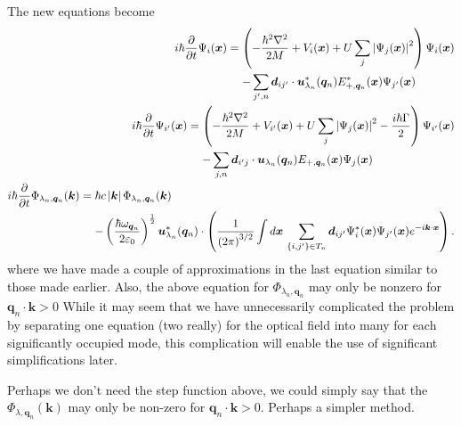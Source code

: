 The new equations become
\begin{subequations}
    \label{OpticalPumping:MeanFieldRWAEvolutionSeparatedOpticalFields}
    \begin{align}
        \begin{split}
            i \hbar \frac{\partial}{\partial t} \Psi_i(\bm{x}) &= \left( -\frac{\hbar^2 \nabla^2}{2M} + V_i(\bm{x}) + U \sum_j \abs{\Psi_j(\bm{x})}^2\right) \Psi_i(\bm{x})\\
            &\relphantom{=} - \sum_{j',n} \bm{d}_{ij'} \cdot \bm{u}^*_{\lambda_n}(\bm{q}_n) {E}_{+,\bm{q}_n}^*(\bm{x}) \Psi_{j'}(\bm{x})
        \end{split}\\
        \begin{split}
            i \hbar \frac{\partial}{\partial t} \Psi_{i'}(\bm{x}) &= \left( -\frac{\hbar^2 \nabla^2}{2M} + V_{i'}(\bm{x}) + U \sum_j \abs{\Psi_j(\bm{x})}^2 - \frac{i\hbar \Gamma}{2}\right) \Psi_{i'}(\bm{x})\\
            &\relphantom{=} - \sum_{j,n} \bm{d}_{i'j} \cdot \bm{u}_{\lambda_n}(\bm{q}_n) {E}_{+,\bm{q}_n}(\bm{x}) \Psi_{j}(\bm{x}) 
        \end{split}\\
        \begin{split}
            i \hbar \frac{\partial}{\partial t} \Phi_{\lambda_n, \bm{q}_n}(\bm{k}) &= \hbar c \abs{\bm{k}} \Phi_{\lambda_n,\bm{q}_n}(\bm{k}) \\
            &\relphantom{=} - \left(\frac{\hbar \omega_{\bm{q}_n}}{2 \varepsilon_0}\right)^{\frac{1}{2}} \bm{u}_{\lambda_n}^*(\bm{q}_n) \cdot \left( \frac{1}{\left(2\pi\right)^{3/2}} \int d \bm{x}\, \sum_{\{i,j'\}\in T_n}\bm{d}_{ij'} \Psi^*_i(\bm{x}) \Psi_{j'}(\bm{x}) e^{-i \bm{k} \cdot \bm{x}} \right).
        \end{split}
    \end{align}
\end{subequations}
where we have made a couple of approximations in the last equation similar to those made earlier. Also, the above equation for $\Phi_{\lambda_n, \bm{q}_n}$ may only be nonzero for $\bm{q}_n \cdot \bm{k} > 0$
While it may seem that we have unnecessarily complicated the problem by separating one equation (two really) for the optical field into many for each significantly occupied mode, this complication will enable the use of significant simplifications later.

Perhaps we don't need the step function above, we could simply say that the $\Phi_{\lambda, \bm{q}_n}(\bm{k})$ may only be non-zero for $\bm{q}_n \cdot \bm{k} > 0$.  Perhaps a simpler method.

